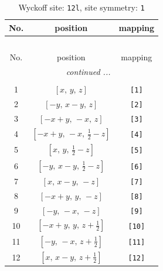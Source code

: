 \documentclass[fleqn,8pt]{jsarticle}
\begin{document}
\begin{longtable}{ccc}
\caption{Wyckoff site: {\tt 12l}, site symmetry: {\tt 1}}
 \\
 \hline \hline
No. & position & mapping \\ \hline \endfirsthead

\multicolumn{2}{l}{\tablename\ \thetable{}} \\
 \hline \hline
No. & position & mapping \\ \hline \endhead

 \hline \hline
\multicolumn{2}{r}{\footnotesize\it continued ...} \\ \endfoot

 \hline \hline
\multicolumn{2}{r}{} \\ \endlastfoot

1 & $\left[ x,\, y,\, z \right]$ & {\tt [1]} \\ \hline
2 & $\left[ - y,\, x - y,\, z \right]$ & {\tt [2]} \\ \hline
3 & $\left[ - x + y,\, - x,\, z \right]$ & {\tt [3]} \\ \hline
4 & $\left[ - x + y,\, - x,\, \frac{1}{2} - z \right]$ & {\tt [4]} \\ \hline
5 & $\left[ x,\, y,\, \frac{1}{2} - z \right]$ & {\tt [5]} \\ \hline
6 & $\left[ - y,\, x - y,\, \frac{1}{2} - z \right]$ & {\tt [6]} \\ \hline
7 & $\left[ x,\, x - y,\, - z \right]$ & {\tt [7]} \\ \hline
8 & $\left[ - x + y,\, y,\, - z \right]$ & {\tt [8]} \\ \hline
9 & $\left[ - y,\, - x,\, - z \right]$ & {\tt [9]} \\ \hline
10 & $\left[ - x + y,\, y,\, z + \frac{1}{2} \right]$ & {\tt [10]} \\ \hline
11 & $\left[ - y,\, - x,\, z + \frac{1}{2} \right]$ & {\tt [11]} \\ \hline
12 & $\left[ x,\, x - y,\, z + \frac{1}{2} \right]$ & {\tt [12]} \\
\end{longtable}
\end{document}
